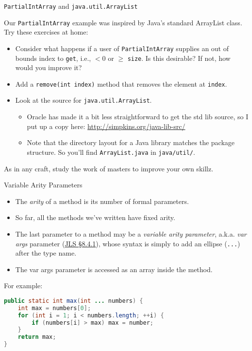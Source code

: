\documentclass{beamer}
\begin{document}
\begin{frame}[fragile]{{\tt PartialIntArray} and {\tt java.util.ArrayList}}


Our {\tt PartialIntArray} example was inspired by Java's standard ArrayList class.  Try these exercises at home:
\begin{itemize}
\item Consider what happens if a user of {\tt PartialIntArray} supplies an out of bounds index to {\tt get}, i.e., $< 0$ or $\ge$ {\tt size}.  Is this desirable?  If not, how would you improve it?
\item Add a {\tt remove(int index)} method that removes the element at {\tt index}.
\item Look at the source for {\tt java.util.ArrayList}.
\begin{itemize}
\item Oracle has made it a bit less straightforward to get the std lib source, so I put up a copy here: \url{http://simpkins.org/java-lib-src/}
\item Note that the directory layout for a Java library matches the package structure.  So you'll find {\tt ArrayList.java} in {\tt java/util/}.
\end{itemize}
\end{itemize}

As in any craft, study the work of masters to improve your own skillz.

\end{frame}

\begin{frame}[fragile]{Variable Arity Parameters}


\begin{itemize}
\item The {\it arity} of a method is its number of formal parameters.
\item So far, all the methods we've written have fixed arity.
\item The last parameter to a method may be a {\it variable arity parameter}, a.k.a. {\it var args} parameter (\href{http://docs.oracle.com/javase/specs/jls/se7/html/jls-8.html#jls-8.4.1}{JLS \S 8.4.1}), whose syntax is simply to add an ellipse ({\tt ...}) after the type name.
\item The var args parameter is accessed as an array inside the method.
\end{itemize}
For example:
\begin{lstlisting}[language=Java]
public static int max(int ... numbers) {
    int max = numbers[0];
    for (int i = 1; i < numbers.length; ++i) {
        if (numbers[i] > max) max = number;
    }
    return max;
}
\end{lstlisting}

\end{frame}
\end{document}
